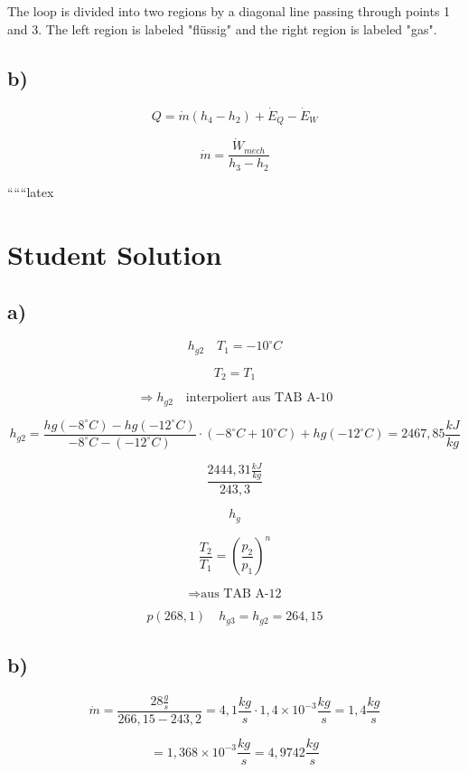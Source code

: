The loop is divided into two regions by a diagonal line passing through points 1 and 3. The left region is labeled "flüssig" and the right region is labeled "gas".

\subsection*{b)}

\begin{equation}
Q = \dot{m} (h_4 - h_2) + \dot{E}_Q - \dot{E}_W
\end{equation}

\begin{equation}
\dot{m} = \frac{\dot{W}_{mech}}{h_3 - h_2}
\end{equation}

``````latex


\section*{Student Solution}

\subsection*{a)}

\[
h_{g2} \quad T_1 = -10^\circ C
\]

\[
T_2 = T_1
\]

\[
\Rightarrow h_{g2} \quad \text{interpoliert aus TAB A-10}
\]

\[
h_{g2} = \frac{hg(-8^\circ C) - hg(-12^\circ C)}{-8^\circ C - (-12^\circ C)} \cdot (-8^\circ C + 10^\circ C) + hg(-12^\circ C) = 2467,85 \frac{kJ}{kg}
\]

\[
\frac{2444,31 \frac{kJ}{kg}}{243,3}
\]

\[
h_{g}
\]

\[
\frac{T_2}{T_1} = \left( \frac{p_2}{p_1} \right)^n
\]

\[
\Rightarrow \text{aus TAB A-12}
\]

\[
p(268,1) \quad h_{g3} = h_{g2} = 264,15
\]

\subsection*{b)}

\[
\dot{m} = \frac{28 \frac{g}{s}}{266,15-243,2} = 4,1 \frac{kg}{s} \cdot 1,4 \times 10^{-3} \frac{kg}{s} = 1,4 \frac{kg}{s}
\]

\[
= 1,368 \times 10^{-3} \frac{kg}{s} = 4,9742 \frac{kg}{s}
\]

